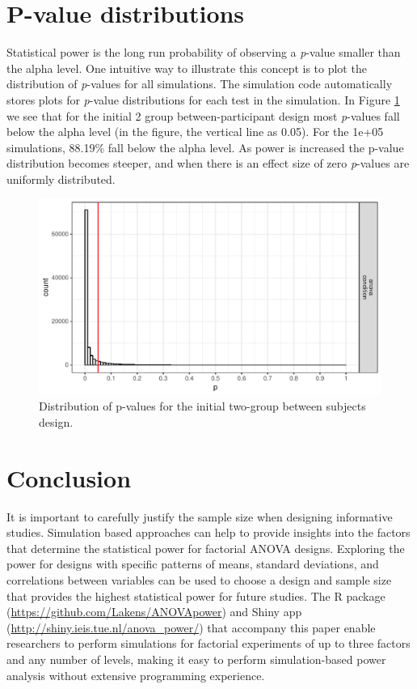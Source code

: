 \documentclass[,jou,floatsintext]{apa6}
\begin{document}
\hypertarget{p-value-distributions}{%
\section{P-value distributions}\label{p-value-distributions}}

Statistical power is the long run probability of observing a \emph{p}-value smaller than the alpha level.
One intuitive way to illustrate this concept is to plot the distribution of \emph{p}-values for all simulations.
The simulation code automatically stores plots for \emph{p}-value distributions for each test in the simulation.
In Figure \ref{fig:p-plot} we see that for the initial 2 group between-participant design most \emph{p}-values fall below the alpha level (in the figure, the vertical line as 0.05).
For the 1e+05 simulations, 88.19\% fall below the alpha level.
As power is increased the p-value distribution becomes steeper, and when there is an effect size of zero \emph{p}-values are uniformly distributed.

\begin{figure}
\centering
\includegraphics{0.1_Simulation_Based_Power_Analysis_For_Factorial_ANOVA_Designs_files/figure-latex/p-plot-1.pdf}
\caption{\label{fig:p-plot}Distribution of p-values for the initial two-group between subjects design.}
\end{figure}

\hypertarget{conclusion}{%
\section{Conclusion}\label{conclusion}}

It is important to carefully justify the sample size when designing informative studies.
Simulation based approaches can help to provide insights into the factors that determine the statistical power for factorial ANOVA designs.
Exploring the power for designs with specific patterns of means, standard deviations, and correlations between variables can be used to choose a design and sample size that provides the highest statistical power for future studies. The R package (\url{https://github.com/Lakens/ANOVApower}) and Shiny app (\url{http://shiny.ieis.tue.nl/anova_power/}) that accompany this paper enable researchers to perform simulations for factorial experiments of up to three factors and any number of levels, making it easy to perform simulation-based power analysis without extensive programming experience.
\end{document}
